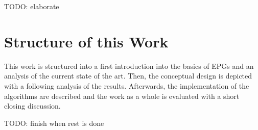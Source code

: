 TODO: elaborate 

\section{Structure of this Work}
\label{ch:Intoduction:sec:Structure}
This work is structured into a first introduction into the basics of EPGs and an analysis of the current state of the art. Then, the conceptual design is depicted with a following analysis of the results. Afterwards, the implementation of the algorithms are described and the work as a whole is evaluated with a short closing discussion.  

TODO: finish when rest is done

